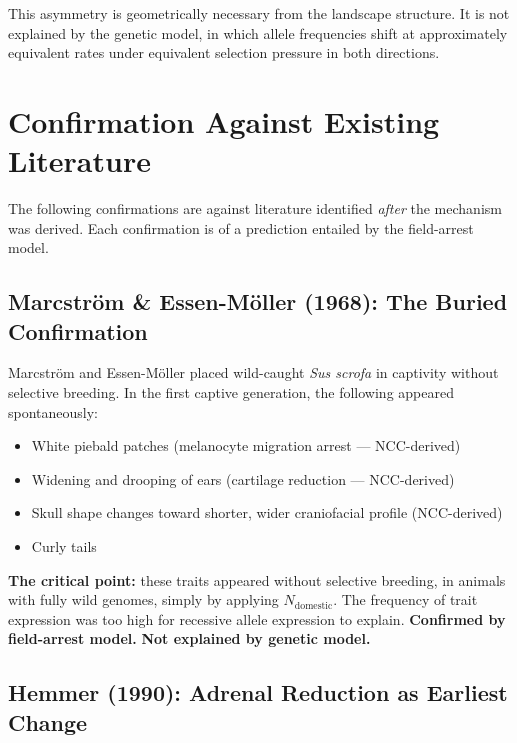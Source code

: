 \documentclass[11pt, a4paper]{article}
\begin{document}
This asymmetry is geometrically necessary from the
landscape structure. It is not explained by the
genetic model, in which allele frequencies shift at
approximately equivalent rates under equivalent
selection pressure in both directions.

\section{Confirmation Against Existing Literature}
\label{sec:confirmation}

The following confirmations are against literature
identified \textit{after} the mechanism was derived.
Each confirmation is of a prediction entailed by the
field-arrest model.

\subsection{Marcstr\"{o}m \& Essen-M\"{o}ller (1968):
The Buried Confirmation}

Marcstr\"{o}m and Essen-M\"{o}ller placed wild-caught
\textit{Sus scrofa} in captivity without selective
breeding. In the first captive generation, the following
appeared spontaneously:

\begin{itemize}[itemsep=0.1em]
  \item White piebald patches (melanocyte migration
    arrest --- NCC-derived)
  \item Widening and drooping of ears (cartilage
    reduction --- NCC-derived)
  \item Skull shape changes toward shorter, wider
    craniofacial profile (NCC-derived)
  \item Curly tails
\end{itemize}

\textbf{The critical point:} these traits appeared
without selective breeding, in animals with fully wild
genomes, simply by applying $N_{\text{domestic}}$.
The frequency of trait expression was too high for
recessive allele expression to explain.
\textbf{Confirmed by field-arrest model.}
\textbf{Not explained by genetic model.}

\subsection{Hemmer (1990): Adrenal Reduction as
Earliest Change}
\end{document}
